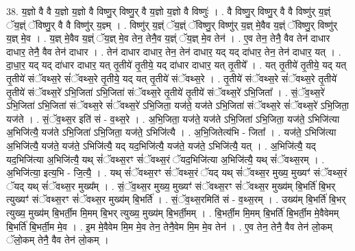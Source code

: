 \documentclass[17pt]{extarticle}
\begin{document}
38. य॒ज्ञो वै वै य॒ज्ञो य॒ज्ञो वै विष्णु॒र् विष्णु॒र् वै य॒ज्ञो य॒ज्ञो वै विष्णुः॑ । . वै विष्णु॒र् विष्णु॒र् वै वै विष्णु॑र् य॒ज्ञ्ं ॅय॒ज्ञ्ं ॅविष्णु॒र् वै वै विष्णु॑र् य॒ज्ञ्म् । . विष्णु॑र् य॒ज्ञ्ं ॅय॒ज्ञ्ं ॅविष्णु॒र् विष्णु॑र् य॒ज्ञ् मे॒वैव य॒ज्ञ्ं ॅविष्णु॒र् विष्णु॑र् य॒ज्ञ् मे॒व । . य॒ज्ञ् मे॒वैव य॒ज्ञ्ं ॅय॒ज्ञ् मे॒व तेन॒ तेनै॒व य॒ज्ञ्ं ॅय॒ज्ञ् मे॒व तेन॑ । . ए॒व तेन॒ तेनै॒ वैव तेन॑ दाधार दाधार॒ तेनै॒ वैव तेन॑ दाधार । . तेन॑ दाधार दाधार॒ तेन॒ तेन॑ दाधार॒ यद् यद् दा॑धार॒ तेन॒ तेन॑ दाधार॒ यत् । . दा॒धा॒र॒ यद् यद् दा॑धार दाधार॒ यत् तृ॒तीये॑ तृ॒तीये॒ यद् दा॑धार दाधार॒ यत् तृ॒तीये᳚ । . यत् तृ॒तीये॑ तृ॒तीये॒ यद् यत् तृ॒तीये॑ संॅवथ्स॒रे सं॑ॅवथ्स॒रे तृ॒तीये॒ यद् यत् तृ॒तीये॑ संॅवथ्स॒रे । . तृ॒तीये॑ संॅवथ्स॒रे सं॑ॅवथ्स॒रे तृ॒तीये॑ तृ॒तीये॑ संॅवथ्स॒रे॑ ऽभि॒जिता॑ ऽभि॒जिता॑ संॅवथ्स॒रे तृ॒तीये॑ तृ॒तीये॑ संॅवथ्स॒रे॑ ऽभि॒जिता᳚ । . सं॒ॅव॒थ्स॒रे॑ ऽभि॒जिता॑ ऽभि॒जिता॑ संॅवथ्स॒रे सं॑ॅवथ्स॒रे॑ ऽभि॒जिता॒ यज॑ते॒ यज॑ते ऽभि॒जिता॑ संॅवथ्स॒रे सं॑ॅवथ्स॒रे॑ ऽभि॒जिता॒ यज॑ते । . सं॒ॅव॒थ्स॒र इति॑ सं - व॒थ्स॒रे । . अ॒भि॒जिता॒ यज॑ते॒ यज॑ते ऽभि॒जिता॑ ऽभि॒जिता॒ यज॑ते॒ ऽभिजि॑त्या अ॒भिजि॑त्यै॒ यज॑ते ऽभि॒जिता॑ ऽभि॒जिता॒ यज॑ते॒ ऽभिजि॑त्यै । . अ॒भि॒जितेत्य॑भि - जिता᳚ । . यज॑ते॒ ऽभिजि॑त्या अ॒भिजि॑त्यै॒ यज॑ते॒ यज॑ते॒ ऽभिजि॑त्यै॒ यद् यद॒भिजि॑त्यै॒ यज॑ते॒ यज॑ते॒ ऽभिजि॑त्यै॒ यत् । . अ॒भिजि॑त्यै॒ यद् यद॒भिजि॑त्या अ॒भिजि॑त्यै॒ यथ् सं॑ॅवथ्स॒रꣳ सं॑ॅवथ्स॒रं ॅयद॒भिजि॑त्या अ॒भिजि॑त्यै॒ यथ् सं॑ॅवथ्स॒रम् । . अ॒भिजि॑त्या॒ इत्य॒भि - जि॒त्यै॒ । . यथ् सं॑ॅवथ्स॒रꣳ सं॑ॅवथ्स॒रं ॅयद् यथ् सं॑ॅवथ्स॒र मुख्य॒ मुख्यꣳ॑ संॅवथ्स॒रं ॅयद् यथ् सं॑ॅवथ्स॒र मुख्य᳚म् । . सं॒ॅव॒थ्स॒र मुख्य॒ मुख्यꣳ॑ संॅवथ्स॒रꣳ सं॑ॅवथ्स॒र मुख्य॑म् बि॒भर्ति॑ बि॒भर् त्युख्यꣳ॑ संॅवथ्स॒रꣳ सं॑ॅवथ्स॒र मुख्य॑म् बि॒भर्ति॑ । . सं॒ॅव॒थ्स॒रमिति॑ सं - व॒थ्स॒रम् । . उख्य॑म् बि॒भर्ति॑ बि॒भर् त्युख्य॒ मुख्य॑म् बि॒भर्ती॒म मि॒मम् बि॒भर् त्युख्य॒ मुख्य॑म् बि॒भर्ती॒मम् । . बि॒भर्ती॒म मि॒मम् बि॒भर्ति॑ बि॒भर्ती॒म मे॒वैवेमम् बि॒भर्ति॑ बि॒भर्ती॒म मे॒व । . इ॒म मे॒वैवेम मि॒म मे॒व तेन॒ तेनै॒वेम मि॒म मे॒व तेन॑ । . ए॒व तेन॒ तेनै॒ वैव तेन॑ लो॒कम् ॅलो॒कम् तेनै॒ वैव तेन॑ लो॒कम् । \newline
\pagebreak
{}
\end{document}
